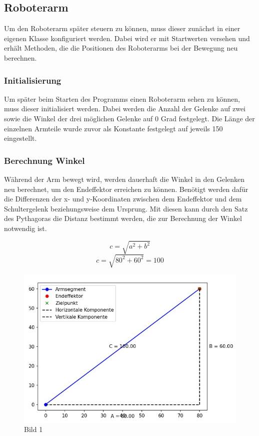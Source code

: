 \documentclass[12pt]{article}
\begin{document}
    \subsection{Roboterarm}
    Um den Roboterarm später steuern zu können, muss dieser zunächst in einer eigenen Klasse konfiguriert
    werden. Dabei wird er mit Startwerten versehen und erhält Methoden, die die Positionen des Roboterarms
    bei der Bewegung neu berechnen.

    \subsubsection{Initialisierung}
    Um später beim Starten des Programms einen Roboterarm sehen zu können, muss dieser initialisiert
    werden. Dabei werden die Anzahl der Gelenke auf zwei sowie die Winkel der drei möglichen Gelenke
    auf 0 Grad festgelegt. Die Länge der einzelnen Armteile wurde zuvor als Konstante festgelegt auf
    jeweils 150 eingestellt.

    

    \subsubsection{Berechnung Winkel}
    Während der Arm bewegt wird, werden dauerhaft die Winkel in den Gelenken neu berechnet, um den
    Endeffektor erreichen zu können. Benötigt werden dafür die Differenzen der x- und y-Koordinaten
    zwischen dem Endeffektor und dem Schultergelenk beziehungsweise dem Ursprung. Mit diesen kann durch
    den Satz des Pythagoras die Distanz bestimmt werden, die zur Berechnung der Winkel notwendig ist.

    \[
        c = \sqrt{a^2 + b^2}
    \]
    \[
        c = \sqrt{80^2 + 60^2} = 100
    \]

    \begin{figure}[h!]
        \centering
        \includegraphics[width = \linewidth]{Bild 1}
        \caption{Bild 1}
    \end{figure}
\end{document}
